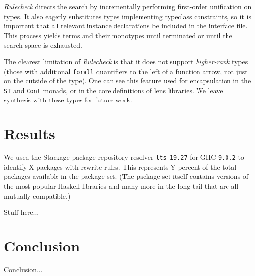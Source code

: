 \documentclass[format=sigconf, nonacm=true, review=true, screen=true]{acmart}
\newcommand{\Rulecheck}{\textit{Rulecheck}\xspace}
\begin{document}
\Rulecheck directs the search by incrementally performing first-order unification on types. It also eagerly substitutes types implementing typeclass constraints, so it is important that all relevant instance declarations be included in the interface file. This process yields terms and their monotypes until terminated or until the search space is exhausted.

The clearest limitation of \Rulecheck is that it does not support \textit{higher-rank} types (those with additional \texttt{forall} quantifiers to the left of a function arrow, not just on the outside of the type). One can see this feature used for encapsulation in the \texttt{ST} and \texttt{Cont} monads, or in the core definitions of lens libraries. We leave synthesis with these types for future work.

\section{Results}

We used the Stackage package repository resolver \texttt{lts-19.27} for GHC \texttt{9.0.2} to identify X packages with rewrite rules. \cite{stackage} This represents Y percent of the total packages available in the package set. (The package set itself contains versions of the most popular Haskell libraries and many more in the long tail that are all mutually compatible.)

Stuff here...

\section{Conclusion}

Conclusion...



\end{document}
